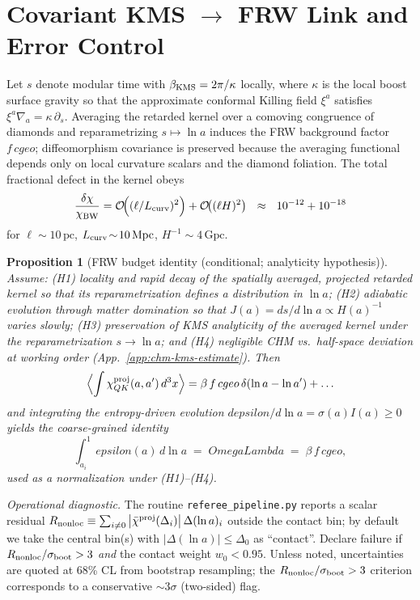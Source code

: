 \documentclass[aps,prd,onecolumn,superscriptaddress,nofootinbib]{revtex4-2}
\def\OmL{OmegaLambda}%
\def\cgeo{cgeo}%
\def\eps{epsilon}%
\def\Omega_\Lambda{OmegaLambda}%
\providecommand{\OmL}{\Omega_\Lambda}
\providecommand{\cgeo}{c_{\rm geo}}
\providecommand{\eps}{\varepsilon}
\providecommand{\be}{\begin{equation}}
\providecommand{\ee}{\end{equation}}
\newtheorem{proposition}{Proposition}
\begin{document}
\section{Covariant KMS \texorpdfstring{$\to$}{->} FRW Link and Error Control}
\label{sec:kms-frw}
Let \(s\) denote modular time with \(\beta_{\rm KMS}=2\pi/\kappa\) locally, where \(\kappa\) is the local boost surface gravity so that the approximate conformal Killing field \(\xi^a\) satisfies \(\xi^a\nabla_a=\kappa\,\partial_s\).
Averaging the retarded kernel over a comoving congruence of diamonds and reparametrizing \(s\mapsto \ln a\) induces the FRW background factor \(f\,\cgeo\); diffeomorphism covariance is preserved because the averaging functional depends only on local curvature scalars and the diamond foliation. The total fractional defect in the kernel obeys
\be
\label{eq:chi-defect}
\frac{\delta\chi}{\chi_{\rm BW}}=\mathcal O\!\Big((\ell/L_{\rm curv})^2\Big)+\mathcal O\!\big((\ell H)^2\big)
\ \ \approx\ \ 10^{-12}+10^{-18}
\ee
for \(\ell\!\sim\!10\,\mathrm{pc}\), \(L_{\rm curv}\!\sim\!10\,\mathrm{Mpc}\), \(H^{-1}\!\sim\!4\,\mathrm{Gpc}\).

\begin{proposition}[FRW budget identity (conditional; analyticity hypothesis)]
\label{prop:frw-budget}
Assume: (H1) locality and rapid decay of the spatially averaged, projected retarded kernel so that its reparametrization defines a distribution in \(\ln a\); (H2) adiabatic evolution through matter domination so that \(J(a)=ds/d\ln a\propto H(a)^{-1}\) varies slowly; (H3) preservation of KMS analyticity of the averaged kernel under the reparametrization \(s\!\to\!\ln a\); and (H4) negligible CHM vs.\ half-space deviation at working order (App.~\ref{app:chm-kms-estimate}). Then
\[
\Big\langle \!\int \chi^{\rm proj}_{QK}(a,a')\,d^3x \Big\rangle
= \beta\, f\, \cgeo\, \delta(\ln a-\ln a') + \ldots
\]
and integrating the entropy-driven evolution \(d\eps/d\ln a=\sigma(a)I(a)\ge0\) yields the coarse-grained identity
\be
\int_{a_i}^{1}\!\eps(a)\,d\ln a \;=\; \OmL \;=\; \beta\, f\,\cgeo,
\label{eq:budget}
\ee
used as a normalization under (H1)–(H4).
\end{proposition}
\noindent\emph{Operational diagnostic.} The routine \texttt{referee\_pipeline.py} reports a scalar residual \(R_{\rm nonloc}\equiv\sum_{i\neq 0}\big|\bar\chi^{\rm proj}(\Delta_i)\big|\,\Delta(\ln a)_i\) outside the contact bin; by default we take the central bin(s) with \(|\Delta(\ln a)|\le \Delta_0\) as ``contact''. Declare failure if \(R_{\rm nonloc}/\sigma_{\rm boot}>3\) \emph{and} the contact weight \(w_0<0.95\). Unless noted, uncertainties are quoted at 68\% CL from bootstrap resampling; the \(R_{\rm nonloc}/\sigma_{\rm boot}>3\) criterion corresponds to a conservative \(\sim\!3\sigma\) (two-sided) flag.
\end{document}
